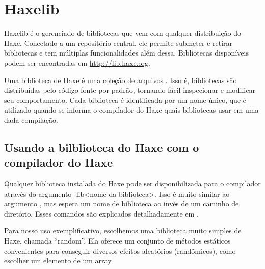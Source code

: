 
\chapter{Haxelib}
\label{haxelib}

Haxelib é o gerenciado de bibliotecas que vem com qualquer distribuição do Haxe. Conectado a um repositório central, ele permite submeter e retirar bibliotecas e tem múltiplas funcionalidades além dessa. Bibliotecas disponíveis podem ser encontradas em \url{http://lib.haxe.org}.

Uma biblioteca de Haxe é uma coleção de arquivos . Isso é, bibliotecas são distribuídas pelo código fonte por padrão, tornando fácil inspecionar e modificar seu comportamento. Cada biblioteca é identificada por um nome único, que é utilizado quando se informa o compilador do Haxe quais bibliotecas usar em uma dada compilação.

\section{Usando a bilblioteca do Haxe com o compilador do Haxe}
\label{haxelib-using-haxe}

Qualquer biblioteca instalada do Haxe pode ser disponibilizada para o compilador através do argumento -lib<nome-da-biblioteca>. Isso é muito similar ao argumento , mas espera um nome de biblioteca ao invés de um caminho de diretório. Esses comandos são explicados detalhadamente em .

Para nosso uso exemplificativo, escolhemos uma biblioteca muito simples de Haxe, chamada ``random''. Ela oferece um conjunto de métodos estáticos convenientes para conseguir diversos efeitos aleatórios (randômicos), como escolher um elemento de um array.


